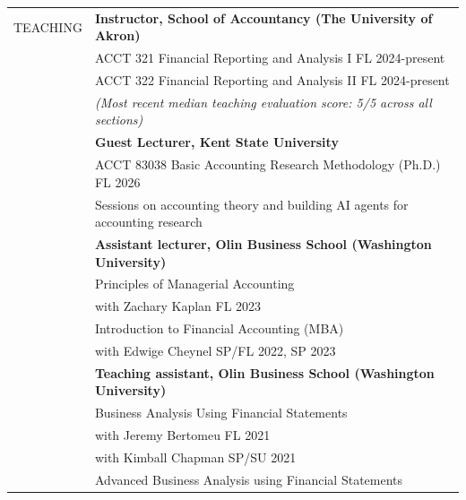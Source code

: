 \documentclass[letterpaper, 11pt]{article}
\begin{document}
\begin{longtable}{p{1.15in}p{5.05in}}
\textcolor{internationalkleinblue}{TEACHING} & \textbf{Instructor, School of Accountancy (The University of Akron)} \\
& ACCT 321 Financial Reporting and Analysis I \hfill FL 2024-present \\
& ACCT 322 Financial Reporting and Analysis II \hfill FL 2024-present \\
& \textit{(Most recent median teaching evaluation score: 5/5 across all sections)} \\
& \textbf{Guest Lecturer, Kent State University} \\
& \hspace{3mm} ACCT 83038 Basic Accounting Research Methodology (Ph.D.) \hfill FL 2026\\
& \hspace{3mm} Sessions on accounting theory and building AI agents for accounting research \\
& \textbf{Assistant lecturer, Olin Business School (Washington University)} \\
 & Principles of Managerial Accounting \\
& \hspace{3mm} with Zachary Kaplan \hfill FL 2023 \\
& Introduction to Financial Accounting (MBA)  \\
& \hspace{3mm} with Edwige Cheynel  \hfill SP/FL 2022, SP 2023 \\
& \textbf{Teaching assistant, Olin Business School (Washington University)}  \\
& Business Analysis Using Financial Statements \\
& \hspace{3mm} with Jeremy Bertomeu  \hfill FL 2021\\
& \hspace{3mm} with Kimball Chapman  \hfill SP/SU 2021\\
& Advanced Business Analysis using Financial Statements \\

\end{longtable}
\end{document}
